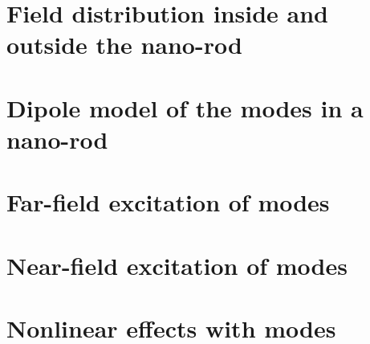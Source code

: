 \section{Field distribution inside and outside the nano-rod}

\section{Dipole model of the modes in a nano-rod}

\section{Far-field excitation of modes}

\section{Near-field excitation of modes}

\section{Nonlinear effects with  modes}



\printbibliography[segment=\therefsegment,heading=subbibliography]




